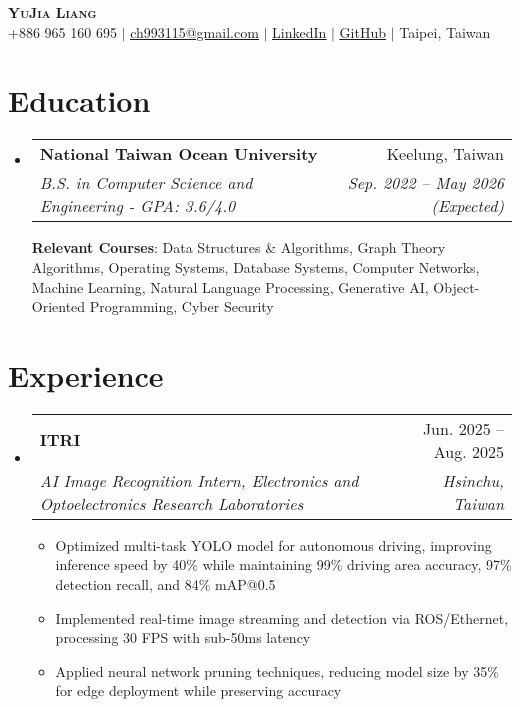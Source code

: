 \documentclass[letterpaper,11pt]{article}
\makeatletter
\newcommand{\resumeItem}[1]{
  \item\small{
    {#1 \vspace{-3pt}}
  }
}
\newcommand{\resumeSubheading}[4]{
  \vspace{-3pt}\item
    \begin{tabular*}{0.97\textwidth}[t]{l@{\extracolsep{\fill}}r}
      \textbf{#1} & #2 \\
      \textit{\small#3} & \textit{\small #4} \\
    \end{tabular*}\vspace{-8pt}
}
\newcommand{\resumeSubHeadingListStart}{\begin{itemize}[leftmargin=0.15in, label={}]}
\newcommand{\resumeSubHeadingListEnd}{\end{itemize}}
\newcommand{\resumeItemListStart}{\begin{itemize}}
\newcommand{\resumeItemListEnd}{\end{itemize}\vspace{-6pt}}
\makeatother
\begin{document}
\begin{center}
    \textbf{\Huge \scshape YuJia Liang} \\ \vspace{1pt}
    \small +886 965 160 695 $|$ \href{mailto:ch993115@gmail.com}{\underline{ch993115@gmail.com}} $|$ \href{https://linkedin.com/in/yujia-liang-77ab022a7}{\underline{LinkedIn}} $|$ \href{https://github.com/itsYoga}{\underline{GitHub}} $|$ {\small{Taipei, Taiwan}}
\end{center}


\section{Education}
  \resumeSubHeadingListStart
    \resumeSubheading
      {National Taiwan Ocean University}{Keelung, Taiwan}
      {B.S. in Computer Science and Engineering - GPA: 3.6/4.0}{Sep. 2022 -- May 2026 (Expected)}

  \vspace{2pt}
  \small{\textbf{Relevant Courses}: Data Structures \& Algorithms, Graph Theory Algorithms, Operating Systems, Database Systems, Computer Networks, Machine Learning, Natural Language Processing, Generative AI, Object-Oriented Programming, Cyber Security}
  
  \resumeSubHeadingListEnd


\section{Experience}
    \resumeSubHeadingListStart
      \resumeSubheading
        {ITRI}{Jun. 2025 -- Aug. 2025}
        {\textit{AI Image Recognition Intern, Electronics and Optoelectronics Research Laboratories}}{Hsinchu, Taiwan}
        \resumeItemListStart
            \resumeItem{Optimized multi-task YOLO model for autonomous driving, improving inference speed by 40\% while maintaining 99\% driving area accuracy, 97\% detection recall, and 84\% mAP@0.5}
            \resumeItem{Implemented real-time image streaming and detection via ROS/Ethernet, processing 30 FPS with sub-50ms latency}
            \resumeItem{Applied neural network pruning techniques, reducing model size by 35\% for edge deployment while preserving accuracy}
        \resumeItemListEnd
    \resumeSubHeadingListEnd


\end{document}
